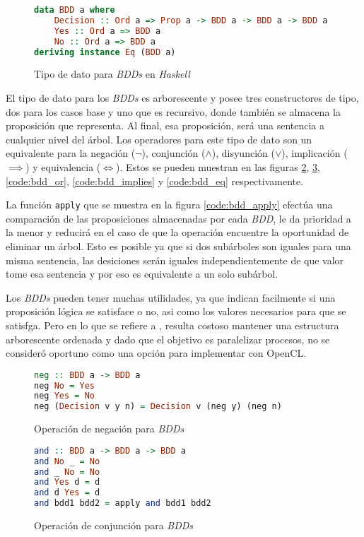 \begin{figure}
\begin{lstlisting}[language=Haskell]
data BDD a where
    Decision :: Ord a => Prop a -> BDD a -> BDD a -> BDD a
    Yes :: Ord a => BDD a
    No :: Ord a => BDD a
deriving instance Eq (BDD a)
\end{lstlisting}
\caption{Tipo de dato para \textit{BDDs} en \textit{Haskell}}
\label{code:bdds}
\end{figure}

El tipo de dato para los \textit{BDDs} es arborescente y posee tres constructores de tipo, dos para los casos base y uno que es recursivo, donde también se almacena la proposición que representa. Al final, esa proposición, será una sentencia a cualquier nivel del árbol. Los operadores para este tipo de dato son un equivalente para la negación ($\neg$), conjunción ($\land$), disyunción ($\lor$), implicación ($\implies$) y equivalencia ($\iff$). Estos se pueden muestran en las figuras \ref{code:bdd_neg}, \ref{code:bdd_and}, \ref{code:bdd_or}, \ref{code:bdd_implies} y \ref{code:bdd_eq} respectivamente.


La función \texttt{apply} que se muestra en la figura \ref{code:bdd_apply} efectúa una comparación de las proposiciones almacenadas por cada \textit{BDD}, le da prioridad a la menor y reducirá en el caso de que la operación encuentre la oportunidad de eliminar un árbol. Esto es posible ya que si dos subárboles son iguales para una misma sentencia, las desiciones serán iguales independientemente de que valor tome esa sentencia y por eso es equivalente a un solo subárbol.

Los \textit{BDDs} pueden tener muchas utilidades, ya que indican facilmente si una proposición lógica se satisface o no, asi como los valores necesarios para que se satisfga. Pero en lo que se refiere a \sat, resulta costoso mantener una estructura arborescente ordenada y dado que el objetivo es paralelizar procesos, no se consideró oportuno como una opción para implementar con OpenCL.

\begin{figure}
\begin{lstlisting}[language=Haskell]
neg :: BDD a -> BDD a
neg No = Yes
neg Yes = No
neg (Decision v y n) = Decision v (neg y) (neg n)
\end{lstlisting}
\caption{Operación de negación para \textit{BDDs}}
\label{code:bdd_neg}
\end{figure}

\begin{figure}
\begin{lstlisting}[language=Haskell]
and :: BDD a -> BDD a -> BDD a
and No _ = No
and _ No = No
and Yes d = d
and d Yes = d
and bdd1 bdd2 = apply and bdd1 bdd2
\end{lstlisting}
\caption{Operación de conjunción para \textit{BDDs}}
\label{code:bdd_and}
\end{figure}

